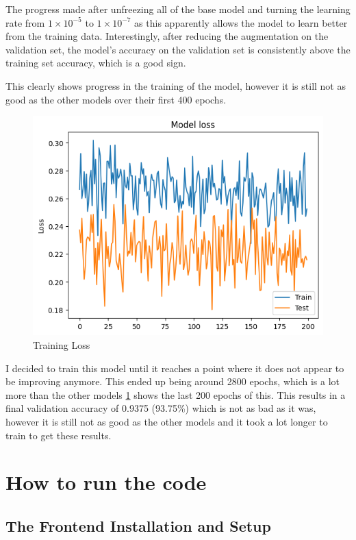 \documentclass[]{final_report}
\begin{document}
The progress made after unfreezing all of the base model and turning the learning rate from $1 \times 10^{-5}$ to $1 \times 10^{-7}$ as this apparently allows the model to learn better from the training data. Interestingly, after reducing the augmentation on the validation set, the model's accuracy on the validation set is consistently above the training set accuracy, which is a good sign.

This clearly shows progress in the training of the model, however it is still not as good as the other models over their first 400 epochs. 

\begin{figure}[ht!]
  \centering
  \includegraphics[width=0.7\linewidth]{images/EfficientNetV2B1-final-training-accuracy.png}
  \caption{Training Loss}
  \label{fig:EfficientNetV2B1-final-training-loss}
\end{figure}

I decided to train this model until it reaches a point where it does not appear to be improving anymore. This ended up being around 2800 epochs, which is a lot more than the other models \ref{fig:EfficientNetV2B1-final-training-loss} shows the last 200 epochs of this. This results in a final validation accuracy of 0.9375 (93.75\%) which is not as bad as it was, however it is still not as good as the other models and it took a lot longer to train to get these results.

\chapter{How to run the code}

\section{The Frontend Installation and Setup}
\end{document}

